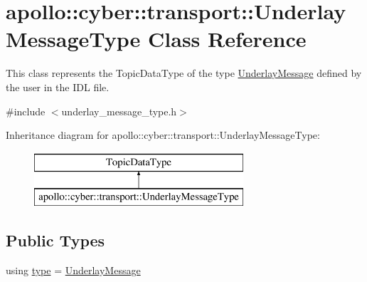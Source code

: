 \hypertarget{classapollo_1_1cyber_1_1transport_1_1UnderlayMessageType}{\section{apollo\-:\-:cyber\-:\-:transport\-:\-:Underlay\-Message\-Type Class Reference}
\label{classapollo_1_1cyber_1_1transport_1_1UnderlayMessageType}
}


This class represents the Topic\-Data\-Type of the type \hyperlink{classapollo_1_1cyber_1_1transport_1_1UnderlayMessage}{Underlay\-Message} defined by the user in the I\-D\-L file.  




{\ttfamily \#include $<$underlay\-\_\-message\-\_\-type.\-h$>$}

Inheritance diagram for apollo\-:\-:cyber\-:\-:transport\-:\-:Underlay\-Message\-Type\-:\begin{figure}[H]
\begin{center}
\leavevmode
\includegraphics[height=2.000000cm]{classapollo_1_1cyber_1_1transport_1_1UnderlayMessageType}
\end{center}
\end{figure}
\subsection*{Public Types}
\begin{DoxyCompactItemize}
\item 
using \hyperlink{classapollo_1_1cyber_1_1transport_1_1UnderlayMessageType_a4b65746e3f848e2f8fcb9c1adef1d84d}{type} = \hyperlink{classapollo_1_1cyber_1_1transport_1_1UnderlayMessage}{Underlay\-Message}
\end{DoxyCompactItemize}
